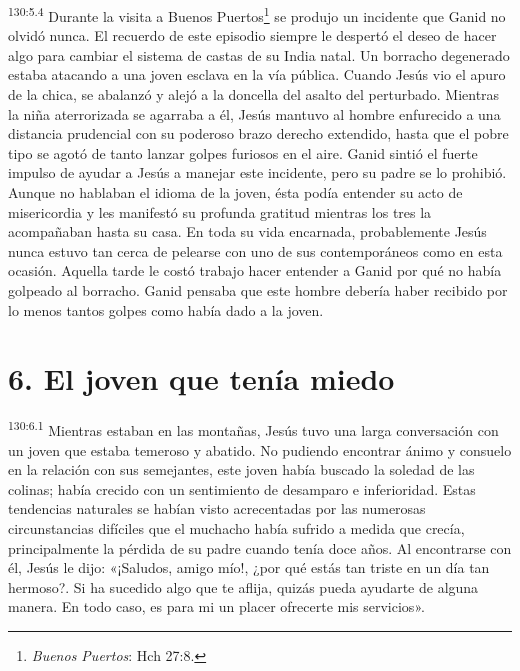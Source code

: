 \par 
\textsuperscript{130:5.4} Durante la visita a Buenos Puertos\footnote{\textit{Buenos Puertos}: Hch 27:8.} se produjo un incidente que Ganid no olvidó nunca. El recuerdo de este episodio siempre le despertó el deseo de hacer algo para cambiar el sistema de castas de su India natal. Un borracho degenerado estaba atacando a una joven esclava en la vía pública. Cuando Jesús vio el apuro de la chica, se abalanzó y alejó a la doncella del asalto del perturbado. Mientras la niña aterrorizada se agarraba a él, Jesús mantuvo al hombre enfurecido a una distancia prudencial con su poderoso brazo derecho extendido, hasta que el pobre tipo se agotó de tanto lanzar golpes furiosos en el aire. Ganid sintió el fuerte impulso de ayudar a Jesús a manejar este incidente, pero su padre se lo prohibió. Aunque no hablaban el idioma de la joven, ésta podía entender su acto de misericordia y les manifestó su profunda gratitud mientras los tres la acompañaban hasta su casa. En toda su vida encarnada, probablemente Jesús nunca estuvo tan cerca de pelearse con uno de sus contemporáneos como en esta ocasión. Aquella tarde le costó trabajo hacer entender a Ganid por qué no había golpeado al borracho. Ganid pensaba que este hombre debería haber recibido por lo menos tantos golpes como había dado a la joven.

\section*{6. El joven que tenía miedo}
\par 
\textsuperscript{130:6.1} Mientras estaban en las montañas, Jesús tuvo una larga conversación con un joven que estaba temeroso y abatido. No pudiendo encontrar ánimo y consuelo en la relación con sus semejantes, este joven había buscado la soledad de las colinas; había crecido con un sentimiento de desamparo e inferioridad. Estas tendencias naturales se habían visto acrecentadas por las numerosas circunstancias difíciles que el muchacho había sufrido a medida que crecía, principalmente la pérdida de su padre cuando tenía doce años. Al encontrarse con él, Jesús le dijo: «¡Saludos, amigo mío!, ¿por qué estás tan triste en un día tan hermoso?. Si ha sucedido algo que te aflija, quizás pueda ayudarte de alguna manera. En todo caso, es para mi un placer ofrecerte mis servicios».

